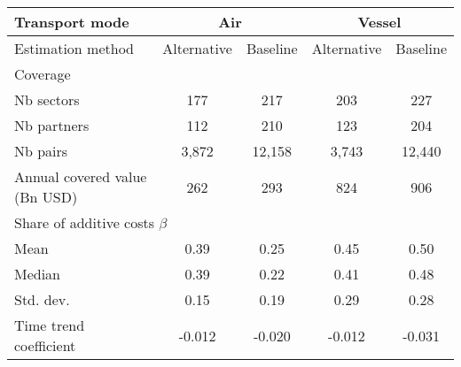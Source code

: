 \begin{tabular}{l|cc|cc}
\cline{1-5}
\multicolumn{1}{l}{Transport mode} &
  \multicolumn{2}{|c|}{Air} &
  \multicolumn{2}{c}{Vessel} \\ \hline
Estimation method &
Alternative &
Baseline &
Alternative &
Baseline \\ \hline
Coverage  \\ \hline
\hspace{1em}Nb sectors &
177 &
217 &
203 &
227 \\
\hspace{1em}Nb partners &
112 &
210 &
123 &
204 \\
\hspace{1em}Nb pairs &
3,872 &
12,158 &
3,743 &
12,440 \\
\hspace{1em}Annual covered value (Bn USD) &
262 &
293 &
824 &
906 \\ \hline
\multicolumn{5}{l}{Share of additive costs $\beta$}  \\ \hline
\hspace{1em}Mean &
0.39 &
0.25 &
0.45 &
0.50 \\
\hspace{1em}Median &
0.39 &
0.22 &
0.41 &
0.48 \\
\hspace{1em}Std. dev. &
0.15 &
0.19 &
0.29 &
0.28 \\
\hspace{1em}Time trend coefficient &
-0.012 &
-0.020 &
-0.012 &
-0.031 \\ \hline
\end{tabular}
